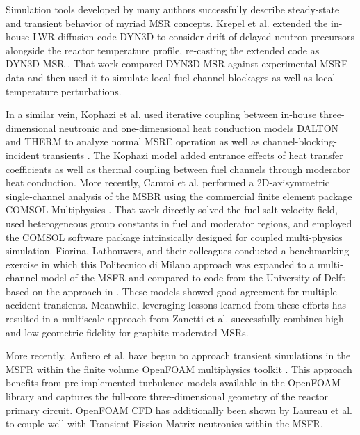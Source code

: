 \documentclass{article}
\begin{document}
Simulation tools developed by many authors successfully describe steady-state and
transient behavior of myriad \gls{MSR} concepts. Krepel et al. extended the in-house \gls{LWR}
diffusion code DYN3D to consider drift of delayed neutron precursors alongside
the reactor temperature profile, re-casting the extended code as
DYN3D-MSR \cite{krepel_dyn3d-msr_2007}. That work compared DYN3D-MSR against
experimental \gls{MSRE} data and then used it to simulate local fuel channel
blockages as well as local temperature perturbations.

In a similar vein, Kophazi et al. used iterative coupling between in-house
three-dimensional neutronic and one-dimensional heat conduction models DALTON
and THERM to analyze normal \gls{MSRE} operation as well as
channel-blocking-incident transients \cite{kophazi_development_2009}. The
Kophazi model added entrance effects of heat transfer coefficients as well as
thermal coupling between fuel channels through moderator heat conduction. More
recently, Cammi et al. performed a 2D-axisymmetric single-channel analysis of
the \gls{MSBR} using the commercial finite element package COMSOL Multiphysics
\cite{cammi_multi-physics_2011}. That work directly solved the fuel salt
velocity field, used heterogeneous group constants in fuel and moderator
regions, and employed the \gls{COMSOL} software package intrinsically designed
for coupled multi-physics simulation.  Fiorina, Lathouwers, and their
colleagues conducted a benchmarking exercise \cite{fiorina_modelling_2014} in
which this Politecnico di Milano approach was expanded to a multi-channel model
of the \gls{MSFR} and compared to code from the University of Delft
\cite{de_zwaan_static_2007,van_der_linden_coupled_2012} based on the approach in
\cite{kophazi_development_2009}. These models showed good agreement for
multiple accident transients. Meanwhile, leveraging lessons learned from these
efforts has resulted in a multiscale approach from Zanetti et al.
\cite{zanetti_geometric_2015} successfully combines high and low geometric
fidelity for graphite-moderated \glspl{MSR}.

More recently, Aufiero et al. \cite{aufiero_development_2014} have begun to
approach transient simulations in the \gls{MSFR} within the finite volume
OpenFOAM multiphysics toolkit \cite{weller_tensorial_1998}.  This approach
benefits from pre-implemented turbulence models available in the OpenFOAM
library and captures the full-core three-dimensional geometry of the reactor
primary circuit.  OpenFOAM \gls{CFD} has additionally been shown by Laureau et
al. \cite{laureau_transient_2017} to couple well with Transient Fission Matrix
neutronics within the \gls{MSFR}.
\end{document}
